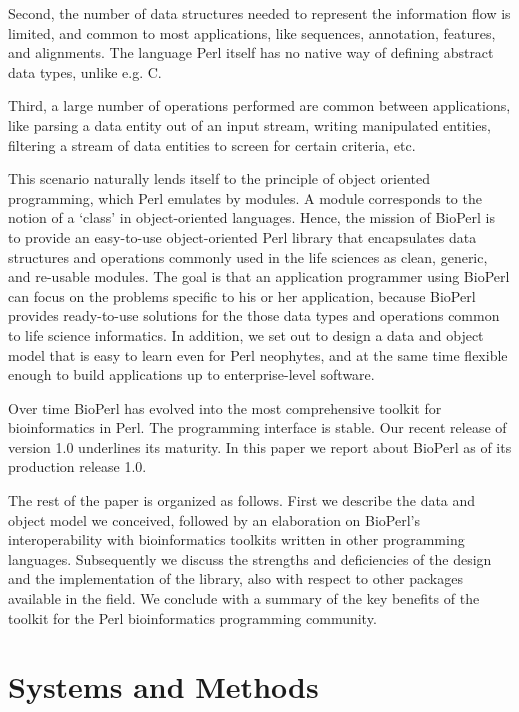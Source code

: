\documentclass{article}
\begin{document}
\begin{twocolumn}
Second, the number of data structures needed to represent the
information flow is limited, and common to most applications, like
sequences, annotation, features, and alignments.  The language Perl
itself has no native way of defining abstract data types, unlike
e.g. C.

Third, a large number of operations performed are common between
applications, like parsing a data entity out of an input stream,
writing manipulated entities, filtering a stream of data entities to
screen for certain criteria, etc. 

This scenario naturally lends itself to the principle of object
oriented programming, which Perl emulates by modules.  A module
corresponds to the notion of a `class' in object-oriented languages.
Hence, the mission of BioPerl is to provide an easy-to-use
object-oriented Perl library that encapsulates data structures and
operations commonly used in the life sciences as clean, generic, and
re-usable modules.  The goal is that an application programmer using
BioPerl can focus on the problems specific to his or her application,
because BioPerl provides ready-to-use solutions for the those data
types and operations common to life science informatics.  In addition,
we set out to design a data and object model that is easy to learn
even for Perl neophytes, and at the same time flexible enough to build
applications up to enterprise-level software.

Over time BioPerl has evolved into the most comprehensive toolkit for
bioinformatics in Perl.  The programming interface is stable.  Our
recent release of version 1.0 underlines its maturity.  In this paper
we report about BioPerl as of its production release 1.0.

The rest of the paper is organized as follows.  First we describe the
data and object model we conceived, followed by an elaboration on
BioPerl's interoperability with bioinformatics toolkits written in
other programming languages.  Subsequently we discuss the strengths and
deficiencies of the design and the implementation of the library, also
with respect to other packages available in the field.  We conclude
with a summary of the key benefits of the toolkit for the Perl
bioinformatics programming community.

\section{Systems and Methods}


\end{twocolumn}
\end{document}
